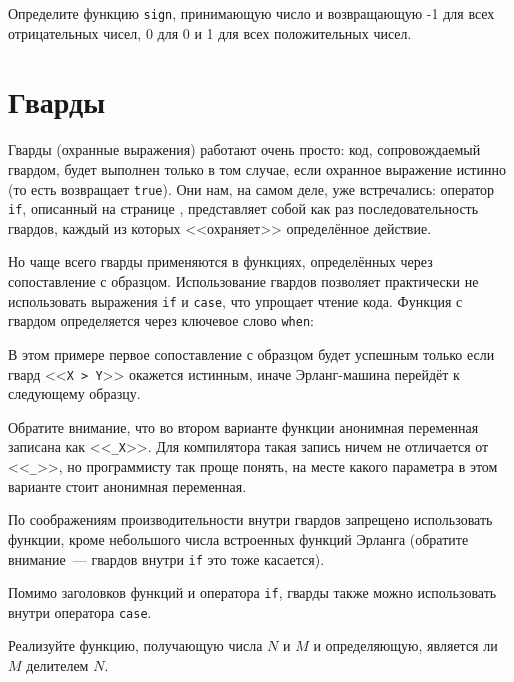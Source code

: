 \documentclass[
  paper=a4,
  fontsize=14pt,
  openany,
  appendixprefix=true
]{scrbook}
\begin{document}
\begin{problem}\label{sign}
Определите функцию \lstinline{sign}, принимающую число и возвращающую -1 для всех отрицательных чисел, 0 для 0 и 1 для всех положительных чисел. 
\end{problem}

\section{Гварды}
\label{guards}

Гварды (охранные выражения) работают очень просто: код, сопровождаемый гвардом, будет выполнен только в том случае, если охранное выражение истинно (то есть возвращает \lstinline{true}). Они нам, на самом деле, уже встречались: оператор \lstinline{if}, описанный на странице \pageref{if}, представляет собой как раз последовательность гвардов, каждый из которых <<охраняет>> определённое действие. 

Но чаще всего гварды применяются в функциях, определённых через сопоставление с образцом. Использование гвардов позволяет практически не использовать выражения \lstinline{if} и \lstinline{case}, что упрощает чтение кода. Функция с гвардом определяется через ключевое слово \lstinline{when}:



В этом примере первое сопоставление с образцом будет успешным только если гвард <<\lstinline{X > Y}>> окажется истинным, иначе Эрланг-машина перейдёт к следующему образцу.

Обратите внимание, что во втором варианте функции анонимная переменная записана как <<\lstinline{_X}>>. Для компилятора такая запись ничем не отличается от <<\lstinline{_}>>, но программисту так проще понять, на месте какого параметра в этом варианте стоит анонимная переменная.

По соображениям производительности внутри гвардов запрещено использовать функции, кроме небольшого числа встроенных функций Эрланга (обратите внимание~--- гвардов внутри \lstinline{if} это тоже касается).

Помимо заголовков функций и оператора \lstinline{if}, гварды также можно использовать внутри оператора \lstinline{case}.

\begin{problem}\label{divisor}
Реализуйте функцию, получающую числа $N$ и $M$ и определяющую, является ли $M$ делителем $N$.
\end{problem}
\end{document}
